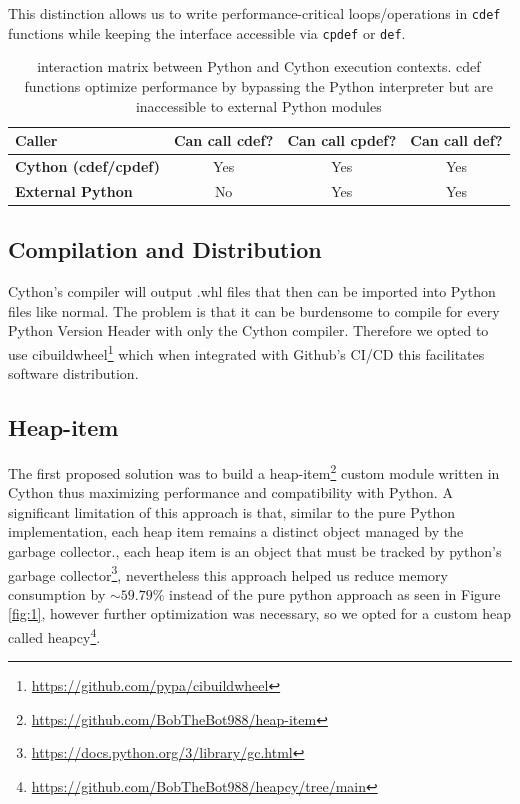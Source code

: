 \documentclass[english,noexaminfo,a4paper,oneside, binding = 0.6cm]{sapthesis}
\begin{document}
This distinction allows us to write performance-critical loops/operations in \texttt{cdef} functions while keeping the interface accessible via \texttt{cpdef} or \texttt{def}.

\begin{table}[h!tbp]
    \centering
    \begin{tabular}{lccc}
        \toprule
        \textbf{Caller} & \textbf{Can call cdef?} & \textbf{Can call cpdef?} & \textbf{Can call def?} \\
        \midrule
        \textbf{Cython (cdef/cpdef)} & Yes & Yes & Yes \\
        \textbf{External Python}     & No  & Yes & Yes \\
        \bottomrule
    \end{tabular}
    \caption{interaction matrix between Python and Cython execution contexts. cdef functions optimize performance by bypassing the Python interpreter but are inaccessible to external Python modules}
    \label{tab:cythonfuncs}
\end{table}

\subsection{Compilation and Distribution}
Cython's compiler will output .whl files that then can be imported into Python files like normal.
The problem is that it can be burdensome to compile for every Python Version Header with only the Cython compiler.
Therefore we opted to use cibuildwheel\footnote{\url{https://github.com/pypa/cibuildwheel}} which when integrated with Github's  CI/CD this facilitates software distribution.

\subsection{Heap-item}
\label{heapitem}
The first proposed solution was to build a heap-item\footnote{\url{https://github.com/BobTheBot988/heap-item}} custom module written in Cython thus maximizing performance and compatibility with Python.
A significant limitation of this approach is that, similar to the pure Python implementation, each heap item remains a distinct object managed by the garbage collector., each heap item is an object that must be tracked by python's garbage collector\footnote{\url{https://docs.python.org/3/library/gc.html}}, nevertheless this approach helped us reduce memory consumption by $\sim59.79\%$ instead of the pure python approach as seen in Figure \ref{fig:1}, however further optimization was necessary, so we opted for a custom heap called heapcy\footnote{\url{https://github.com/BobTheBot988/heapcy/tree/main}}.
\end{document}

